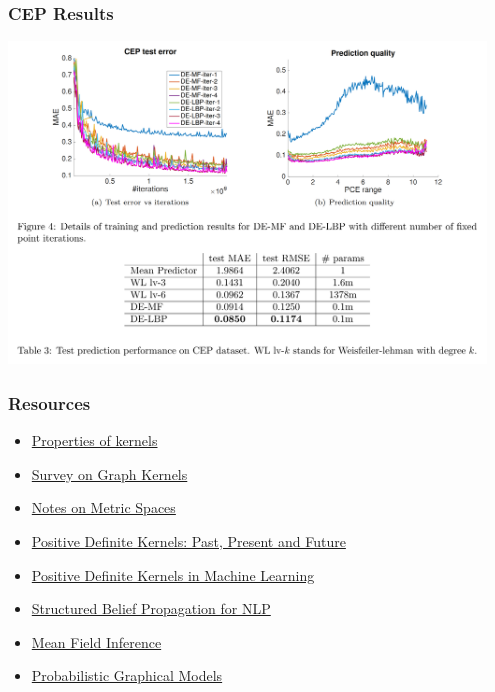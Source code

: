 \documentclass{beamer}
\begin{document}
    \begin{frame}
        \frametitle{CEP Results}
        \begin{center}
            \includegraphics[width=0.95\textwidth]{cep_results.png}
        \end{center}
    \end{frame}

    \begin{frame}
        \frametitle{Resources}
        \begin{itemize}
            \item \href{https://people.eecs.berkeley.edu/~jordan/kernels/0521813972c03_p47-84.pdf}{Properties of kernels}
            \item \href{https://arxiv.org/pdf/1903.11835.pdf}{Survey on Graph Kernels}
            \item \href{https://www.cs.mcgill.ca/~prakash/Courses/599/Notes/metric_spaces.pdf}{Notes on Metric Spaces}
            \item \href{http://www.math.iit.edu/~fass/PDKernels.pdf}{Positive Definite Kernels: Past, Present and Future}
            \item \href{https://marcocuturi.net/Papers/pdk_in_ml.pdf}{Positive Definite Kernels in Machine Learning}
            \item \href{http://www.cs.cmu.edu/~mgormley/bp-tutorial/}{Structured Belief Propagation for NLP}
            \item \href{http://luthuli.cs.uiuc.edu/~daf/courses/AutonomousCars/autoencodernotes.pdf}{Mean Field Inference}
            \item \href{https://frnsys.com/ai_notes/foundations/probabilistic_graphical_models.html}{Probabilistic Graphical Models}
        \end{itemize}
    \end{frame}
%        
\end{document}
